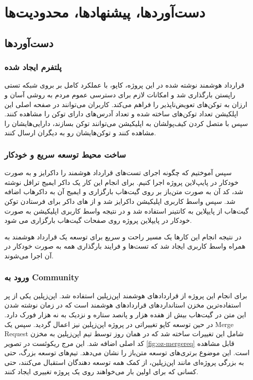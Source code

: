 \chapter{دست‌آوردها، پیشنهاد‌ها، محدودیت‌ها}

\section{دست‌آوردها}

\subsection{پلتفرم ایجاد شده}
قرارداد هوشمند نوشته شده در این پروژه،
کاپو، با عملکرد کامل بر بروی شبکه تستی راپستن بارگذاری شد
و امکانات لازم برای دسترسی عموم مردم به روشی آسان و ارزان به توکن‌های تعویض‌ناپذیر را فراهم می‌کند.
کاربران می‌توانند در صفحه اصلی این اپلکیشن تعداد توکن‌های ساخته شده و تعداد آدرس‌های دارای توکن را مشاهده کنند.
سپس با متصل کردن کیف‌پولشان به اپلیکیشن می‌توانند توکن بسازند،
دارایی‌هایشان را مشاهده کنند و توکن‌هایشان رو به دیگران ارسال کنند.

\subsection{ساخت محیط توسعه سریع و خودکار}
سپس آموختیم که چگونه اجرای تست‌های قرارداد هوشمند را داکرایز و به صورت خودکار در پایپ‌لاین پروژه اجرا کنیم.
برای انجام این کار یک داکر ایمیج ترافل نوشته شد،
کد آن به صورت متن‌باز بر روی گیت‌هاب بارگزاری و ایمیج آن به داکرهاب اضافه شد. سپس واسط کاربری اپلیکیشن داکرایز شد و از
های داکر برای فرستادن توکن گیت‌هاب از پایپلاین به کانتینر استفاده شد
و در نتیجه واسط کاربری اپلیکیشن به صورت خودکار در پایپلاین پروژه روی صفحات گیت‌هاب بارگزاری می شود.

در نتیجه انجام این کارها یک مسیر راحت و سریع برای توسعه یک قرارداد هوشمند به همراه واسط کاربری ایجاد شد که تست‌ها
و فرایند بارگذاری همه به صورت خودکار در آن اجرا می‌شوند.


\subsection{ورود به
\gls{Community}}
برای انجام این پروژه از قرارداد‌های هوشمند اپن‌زپلین استفاده شد.
اپن‌زپلین یکی از پر استفاده‌ترین مخزن استانداردهای قراردادهای هوشمند است
که در زمان نوشته شدن این متن در گیت‌هاب بیش از هفده هزار و پانصد ستاره و نزدیک به نه هزار فورک دارد.
در حین توسعه کاپو تغییراتی در پروژه اپن‌زپلین نیز اعمال گردید.
سپس یک
\gls{Merge Request}
شامل این تغییرات ساخته شد که در همان روز توسط تیم اپن‌زپلین به مخزن کد اصلی اضافه شد.
این مرج ریکوئست در تصویر
\ref{fig:oz-mergereq}
قابل مشاهده است.
این موضوع برتری‌های توسعه متن‌باز را نشان می‌دهد.
تیم‌های توسعه بزرگ، حتی به بزرگی پروژه‌ای مانند اپن‌زپلین، از کمک همه توسعه دهندگان استقبال می‌کنند،
حتی کسانی که برای اولین بار می‌خواهند روی یک پروژه تغییری ایجاد کنند.



